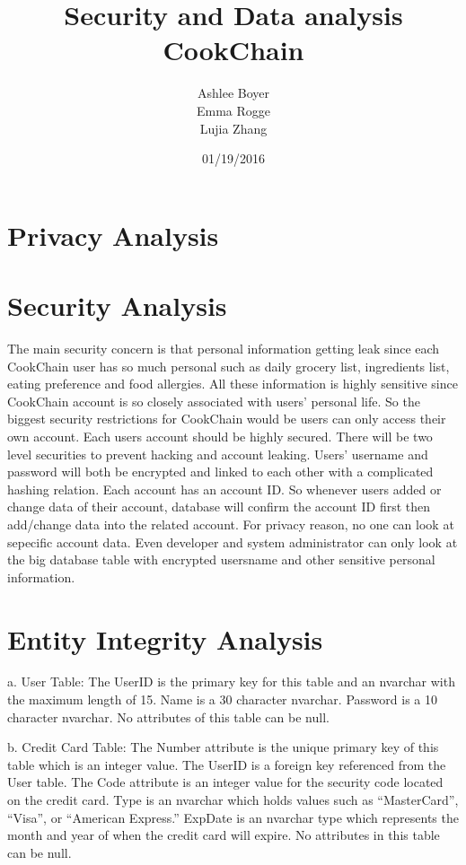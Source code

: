 \documentclass{article}
\title{\textbf{Security and Data analysis  \\ CookChain}}
\author{Ashlee Boyer \\Emma Rogge \\ Lujia Zhang}
\date{01/19/2016}
\begin{document}
\maketitle
\renewcommand*\contentsname{Table of Contents} 
\newpage
\tableofcontents
\clearpage
\section{Privacy Analysis}

\section{Security Analysis}
The main security concern is that personal information getting leak since each CookChain user has so much personal such as daily grocery list, ingredients list, eating preference and food allergies. All these information is highly sensitive since CookChain account is so closely associated with users' personal life. So the biggest security restrictions for CookChain would be users can only access their own account. Each users account should be highly secured. There will be two level securities to prevent hacking and account leaking. Users' username and password will both be encrypted and linked to each other with a complicated hashing relation. Each account has an account ID. So whenever users added or change data of their account, database will confirm the account ID first then add/change data into the related account. For privacy reason, no one can look at sepecific account data. Even developer and system administrator can only look at the big database table with encrypted usersname and other sensitive personal information.
\section{Entity Integrity Analysis}
a.	User Table: The UserID is the primary key for this table and an nvarchar with the maximum length of 15. Name is a 30 character nvarchar. Password is a 10 character nvarchar. No attributes of this table can be null.
 
b.	Credit Card Table: The Number attribute is the unique primary key of this table which is an integer value. The UserID is a foreign key referenced from the User table. The Code attribute is an integer value for the security code located on the credit card. Type is an nvarchar which holds values such as “MasterCard”, “Visa”, or “American Express.” ExpDate is an nvarchar type which represents the month and year of when the credit card will expire. No attributes in this table can be null.
\end{document}
